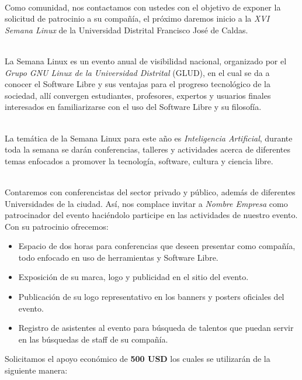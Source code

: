 
\\

Como comunidad, nos contactamos con ustedes con el objetivo de exponer la solicitud de patrocinio a su compañía, el próximo %
daremos inicio a la \textit{XVI Semana Linux} de la Universidad Distrital Francisco Jos\'e de Caldas.

\\
La Semana Linux es un evento anual de visibilidad nacional, organizado por el \textit{Grupo GNU Linux de la Universidad Distrital} (GLUD), en el cual se da a conocer el Software Libre y sus ventajas para el progreso tecnológico de la sociedad, allí convergen estudiantes, profesores, expertos y usuarios finales interesados en familiarizarse con el uso del Software Libre y su filosofía.

\\
La temática de la Semana Linux para este año es \textit{Inteligencia Artificial}, durante toda la semana se darán conferencias, talleres y actividades acerca de diferentes temas enfocados a promover la tecnología, software, cultura y ciencia libre.

\\
Contaremos con conferencistas del sector privado y público, además de diferentes Universidades de la ciudad. Así, nos complace invitar a \textit{Nombre Empresa} como patrocinador del evento haciéndolo participe en las actividades de nuestro evento. Con su patrocinio ofrecemos:

\begin{itemize}
    \item Espacio de dos horas para conferencias que deseen presentar como compañía, todo enfocado en uso de herramientas y Software Libre.
    \item Exposición de su marca, logo y publicidad en el sitio del evento.
    \item Publicación de su logo representativo en los banners y posters oficiales del evento.
    \item Registro de asistentes al evento para b\'usqueda de talentos que puedan servir en las b\'usquedas de staff de su compañía.
\end{itemize}

Solicitamos el apoyo económico de \textbf{500 USD} los cuales se utilizarán de la siguiente manera:

